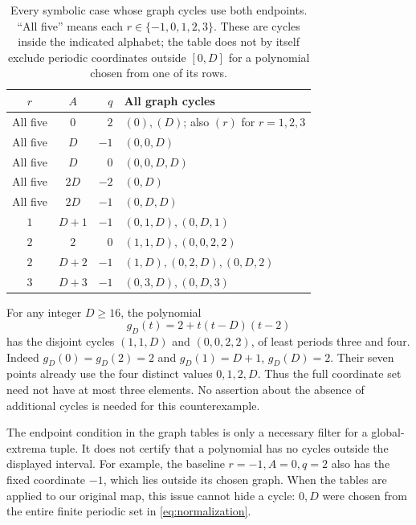 \begin{table}[htbp]
\centering\small
\begin{tabular}{@{}c c r p{8.4cm}@{}}
\toprule
$r$ & $A$ & $q$ & All graph cycles\\
\midrule
All five & $0$ & $2$ & $(0),(D)$; also $(r)$ for $r=1,2,3$\\
All five & $D$ & $-1$ & $(0,0,D)$\\
All five & $D$ & $0$ & $(0,0,D,D)$\\
All five & $2D$ & $-2$ & $(0,D)$\\
All five & $2D$ & $-1$ & $(0,D,D)$\\
\midrule
$1$ & $D+1$ & $-1$ & $(0,1,D),(0,D,1)$\\
$2$ & $2$ & $0$ & $(1,1,D),(0,0,2,2)$\\
$2$ & $D+2$ & $-1$ & $(1,D),(0,2,D),(0,D,2)$\\
$3$ & $D+3$ & $-1$ & $(0,3,D),(0,D,3)$\\
\bottomrule
\end{tabular}
\caption{Every symbolic case whose graph cycles use both endpoints.
``All five'' means each $r\in\{-1,0,1,2,3\}$. These are cycles
inside the indicated alphabet; the table does not by itself exclude
periodic coordinates outside $[0,D]$ for a polynomial chosen from
one of its rows.}
\label{tab:large-patterns}
\end{table}

\begin{remark}
\label{rem:four-symbols}
For any integer $D\ge16$, the polynomial
\[
 g_D(t)=2+t(t-D)(t-2)
\]
has the disjoint cycles $(1,1,D)$ and $(0,0,2,2)$, of least
periods three and four. Indeed $g_D(0)=g_D(2)=2$ and
$g_D(1)=D+1$, $g_D(D)=2$. Their seven points already use the
four distinct values $0,1,2,D$. Thus the full coordinate set need
not have at most three elements. No assertion about the absence of
additional cycles is needed for this counterexample.
\end{remark}

The endpoint condition in the graph tables is only a necessary
filter for a global-extrema tuple. It does not certify that a
polynomial has no cycles outside the displayed interval. For example,
the baseline $r=-1,A=0,q=2$ also has the fixed coordinate $-1$,
which lies outside its chosen graph. When the tables are applied to
our original map, this issue cannot hide a cycle: $0,D$ were chosen
from the entire finite periodic set in \eqref{eq:normalization}.
